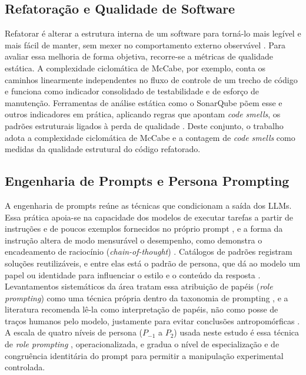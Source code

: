 \documentclass[10pt,conference,a4paper,twocolumn]{article}
\begin{document}
\subsection{Refatoração e Qualidade de Software}
Refatorar é alterar a estrutura interna de um software para torná-lo mais legível e mais fácil de manter, sem mexer no comportamento externo observável \cite{fowler}. Para avaliar essa melhoria de forma objetiva, recorre-se a métricas de qualidade estática. A complexidade ciclomática de McCabe, por exemplo, conta os caminhos linearmente independentes no fluxo de controle de um trecho de código \cite{mccabe1976} e funciona como indicador consolidado de testabilidade e de esforço de manutenção. Ferramentas de análise estática como o SonarQube põem esse e outros indicadores em prática, aplicando regras que apontam \textit{code smells}, os padrões estruturais ligados à perda de qualidade \cite{sonarqube}. Deste conjunto, o trabalho adota a complexidade ciclomática de McCabe e a contagem de \textit{code smells} como medidas da qualidade estrutural do código refatorado.

\subsection{Engenharia de Prompts e Persona Prompting}
A engenharia de prompts reúne as técnicas que condicionam a saída dos LLMs. Essa prática apoia-se na capacidade dos modelos de executar tarefas a partir de instruções e de poucos exemplos fornecidos no próprio prompt \cite{brown2020}, e a forma da instrução altera de modo mensurável o desempenho, como demonstra o encadeamento de raciocínio (\textit{chain-of-thought}) \cite{wei2022}. Catálogos de padrões registram soluções reutilizáveis, e entre elas está o padrão de persona, que dá ao modelo um papel ou identidade para influenciar o estilo e o conteúdo da resposta \cite{white2023}. Levantamentos sistemáticos da área tratam essa atribuição de papéis (\textit{role prompting}) como uma técnica própria dentro da taxonomia de prompting \cite{schulhoff2024}, e a literatura recomenda lê-la como interpretação de papéis, não como posse de traços humanos pelo modelo, justamente para evitar conclusões antropomórficas \cite{shanahan2023}. A escala de quatro níveis de persona ($P_{-1}$ a $P_2$) usada neste estudo é essa técnica de \textit{role prompting} \cite{white2023}, \cite{schulhoff2024} operacionalizada, e gradua o nível de especialização e de congruência identitária do prompt para permitir a manipulação experimental controlada.
\end{document}
